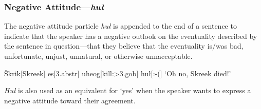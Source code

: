 \documentclass[a4paper,11pt,oneside,openany]{memoir}
\newcommand{\vS}{Š}
\begin{document}
\subsubsection{Negative Attitude---\textit{hu\l}}

The negative attitude particle \textit{hu\l} is appended to the end of a sentence to indicate that the speaker has a negative outlook on the eventuality described by the sentence in question---that they believe that the eventuality is/was bad, unfortunate, unjust, unnatural, or otherwise unnacceptable.

\ex 
\begingl
\vS krik[Skreek]
es[\sc 3.abstr]
uheog[kill:{\sc >3.gob}]
hu\l[:-{(}]
\glft `Oh no, Skreek died!'
\endgl
\xe

\textit{Hu\l} is also used as an equivalent for `yes' when the speaker wants to express a negative attitude toward their agreement.

\end{document}

